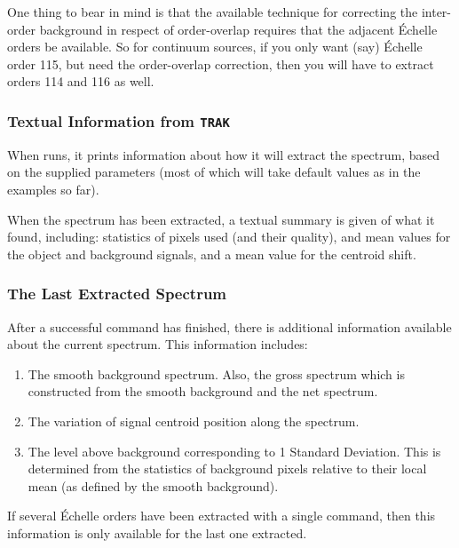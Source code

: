One thing to bear in mind is that the available technique for
correcting the inter-order background in respect of order-overlap requires
that the adjacent \'{E}chelle orders be available.  So for continuum
sources, if you only want (say) \'{E}chelle order 115, but need the
order-overlap correction, then you will have to extract orders 114 and 116 as
well.

\subsubsection{Textual Information from {\tt TRAK}}

When 
 runs, it prints information about how it will extract the
spectrum, based on the supplied parameters (most of which will take default
values as in the examples so far)\@.

When the spectrum has been extracted, a textual summary is given of what it
found, including: statistics of pixels used (and their quality), and mean
values for the object and background signals, and a mean value for the centroid
shift.

\subsubsection{The Last Extracted Spectrum}

After a successful 
 command has finished, there is additional
information available about the current spectrum.  This information
includes:

\begin{enumerate}

\item The smooth background spectrum.  Also, the gross spectrum which
      is constructed from the smooth background and the net spectrum.

\item The variation of signal centroid position along the spectrum.

\item The level above background corresponding to 1 Standard
      Deviation.  This is determined from the statistics of background pixels
      relative to their local mean (as defined by the smooth background)\@.

\end{enumerate}

If several \'{E}chelle orders have been extracted with a single
command, then this information is only available for the last one extracted.

